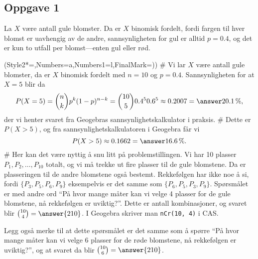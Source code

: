 \subsection*{Oppgave 1}
La $X$ være antall gule blomster.
Da er $X$ binomisk fordelt, fordi fargen til hver blomst er uavhengig av de andre, sannsynligheten for gul er alltid $p = 0.4$, og det er kun to utfall per blomst---enten gul eller rød.

\begin{easylist}[enumerate]
	\ListProperties(Style2*=,Numbers=a,Numbers1=l,FinalMark={)})
	# Vi lar $X$ være antall gule blomster, da er $X$ binomisk fordelt med $n=10$ og $p=0.4$. 
	Sannsynligheten for at $X=5$ blir da
	\begin{equation*}
	P(X = 5) = \binom{n}{k} p^k (1-p)^{n-k} = 
	\binom{10}{5} 0.4^5 0.6^{5} \approx 0.2007 = \answer{20.1 \, \%},
	\end{equation*}
	der vi henter svaret fra Geogebras sannsynlighetskalkulator i praksis.
	# Dette er $P(X > 5)$, og fra sannsynlighetskalkulatoren i Geogebra får vi
	\begin{equation*}
	P(X > 5) \approx 0.1662 = \answer{16.6 \, \%} .
	\end{equation*}
	# Her kan det være nyttig å snu litt på problemstillingen.
	Vi har 10 plasser $P_1, P_2, \dots, P_{10}$ totalt, og vi må trekke ut fire plasser til de gule blomstene.
	Da er plasseringen til de andre blomstene også bestemt.
	Rekkefølgen har ikke noe å si, fordi $\{ P_3, P_5, P_6, P_9 \}$ eksempelvis er det samme som $\{ P_6, P_5, P_3, P_9 \}$.
	Spørsmålet er med andre ord ``På hvor mange måter kan vi velge 4 plasser for de gule blomstene, nå rekkefølgen er uviktig?''.
	Dette er antall kombinasjoner, og svaret blir $\binom{10}{4} = \answer{210}$.
	I Geogebra skriver man \verb|nCr(10, 4)| i CAS.
	
	Legg også merke til at dette spørsmålet er det samme som å spørre ``På hvor mange måter kan vi velge 6 plasser for de røde blomstene, nå rekkefølgen er uviktig?'', og at svaret da blir $\binom{10}{6} = \answer{210}$.
\end{easylist}

